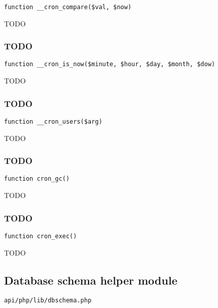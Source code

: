 \documentclass[a4paper]{article}
\begin{document}
\begin{lstlisting}
function __cron_compare($val, $now)
\end{lstlisting}

TODO

\hypertarget{toc402}{}
\subsubsection{TODO}

\begin{lstlisting}
function __cron_is_now($minute, $hour, $day, $month, $dow)
\end{lstlisting}

TODO

\hypertarget{toc403}{}
\subsubsection{TODO}

\begin{lstlisting}
function __cron_users($arg)
\end{lstlisting}

TODO

\hypertarget{toc404}{}
\subsubsection{TODO}

\begin{lstlisting}
function cron_gc()
\end{lstlisting}

TODO

\hypertarget{toc405}{}
\subsubsection{TODO}

\begin{lstlisting}
function cron_exec()
\end{lstlisting}

TODO

\hypertarget{toc406}{}
\subsection{Database schema helper module}

\begin{lstlisting}
api/php/lib/dbschema.php
\end{lstlisting}
\end{document}
